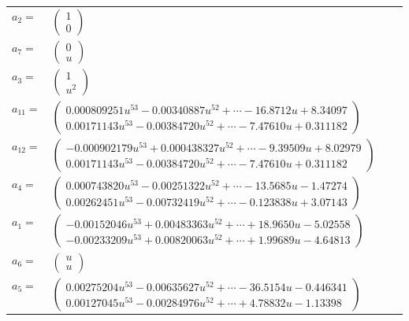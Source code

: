 \documentclass[1p]{elsarticle_modified}
\theoremstyle{definition}
\begin{document}
\begin{tabular}{m{7pt} m{180pt} m{7pt} m{180pt} }
\flushright $a_{2}=$&$\begin{pmatrix}1\\0\end{pmatrix}$ \\
\flushright $a_{7}=$&$\begin{pmatrix}0\\u\end{pmatrix}$ \\
\flushright $a_{3}=$&$\begin{pmatrix}1\\u^2\end{pmatrix}$ \\
\flushright $a_{11}=$&$\begin{pmatrix}0.000809251 u^{53}-0.00340887 u^{52}+\cdots-16.8712 u+8.34097\\0.00171143 u^{53}-0.00384720 u^{52}+\cdots-7.47610 u+0.311182\end{pmatrix}$ \\
\flushright $a_{12}=$&$\begin{pmatrix}-0.000902179 u^{53}+0.000438327 u^{52}+\cdots-9.39509 u+8.02979\\0.00171143 u^{53}-0.00384720 u^{52}+\cdots-7.47610 u+0.311182\end{pmatrix}$ \\
\flushright $a_{4}=$&$\begin{pmatrix}0.000743820 u^{53}-0.00251322 u^{52}+\cdots-13.5685 u-1.47274\\0.00262451 u^{53}-0.00732419 u^{52}+\cdots-0.123838 u+3.07143\end{pmatrix}$ \\
\flushright $a_{1}=$&$\begin{pmatrix}-0.00152046 u^{53}+0.00483363 u^{52}+\cdots+18.9650 u-5.02558\\-0.00233209 u^{53}+0.00820063 u^{52}+\cdots+1.99689 u-4.64813\end{pmatrix}$ \\
\flushright $a_{6}=$&$\begin{pmatrix}u\\u\end{pmatrix}$ \\
\flushright $a_{5}=$&$\begin{pmatrix}0.00275204 u^{53}-0.00635627 u^{52}+\cdots-36.5154 u-0.446341\\0.00127045 u^{53}-0.00284976 u^{52}+\cdots+4.78832 u-1.13398\end{pmatrix}$ \\

\end{tabular}
\end{document}
